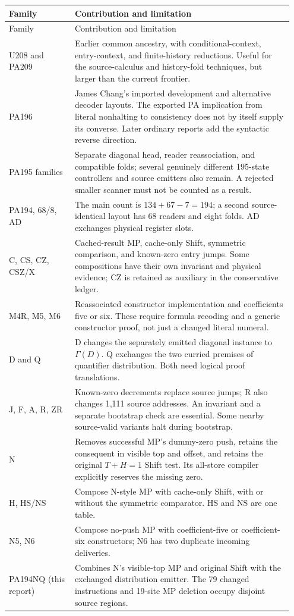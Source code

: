 \documentclass[10pt,letterpaper]{article}
\begin{document}
\begin{longtable}{@{}p{0.22\linewidth}p{0.73\linewidth}@{}}
\toprule
Family & Contribution and limitation\\\midrule\endfirsthead
\toprule Family & Contribution and limitation\\\midrule\endhead
U208 and PA209 & Earlier common ancestry, with conditional-context,
entry-context, and finite-history reductions. Useful for the source-calculus
and history-fold techniques, but larger than the current frontier.\\[4pt]
PA196 & James Chang's imported development and alternative decoder layouts.
The exported PA implication from literal nonhalting to consistency does not
by itself supply its converse. Later ordinary reports add the syntactic
reverse direction.\\[4pt]
PA195 families & Separate diagonal head, reader reassociation, and compatible
folds; several genuinely different 195-state controllers and source emitters
also remain. A rejected smaller scanner must not be counted as a result.\\[4pt]
PA194, 68/8, AD & The main count is \(134+67-7=194\); a second source-identical
layout has 68 readers and eight folds. AD exchanges physical register slots.\\[4pt]
C, CS, CZ, CSZ/X & Cached-result MP, cache-only Shift, symmetric comparison,
and known-zero entry jumps. Some compositions have their own invariant and
physical evidence; CZ is retained as auxiliary in the conservative ledger.\\[4pt]
M4R, M5, M6 & Reassociated constructor implementation and coefficients five
or six. These require formula recoding and a generic constructor proof,
not just a changed literal numeral.\\[4pt]
D and Q & D changes the separately emitted diagonal instance to
\(\Gamma(D)\). Q exchanges the two curried premises of quantifier
distribution. Both need logical proof translations.\\[4pt]
J, F, A, R, ZR & Known-zero decrements replace source jumps; R also changes
1,111 source addresses. An invariant and a separate bootstrap check are
essential. Some nearby source-valid variants halt during bootstrap.\\[4pt]
N & Removes successful MP's dummy-zero push, retains the consequent in
visible top and offset, and retains the original \(T+H=1\) Shift test.
Its all-store compiler explicitly reserves the missing zero.\\[4pt]
H, HS/NS & Compose N-style MP with cache-only Shift, with or without the
symmetric comparator. HS and NS are one table.\\[4pt]
N5, N6 & Compose no-push MP with coefficient-five or coefficient-six
constructors; N6 has two duplicate incoming deliveries.\\[4pt]
PA194NQ (this report) & Combines N's visible-top MP and original Shift with
the exchanged distribution emitter. The 79 changed instructions and
19-site MP deletion occupy disjoint source regions.\\
\bottomrule
\end{longtable}
\end{document}
